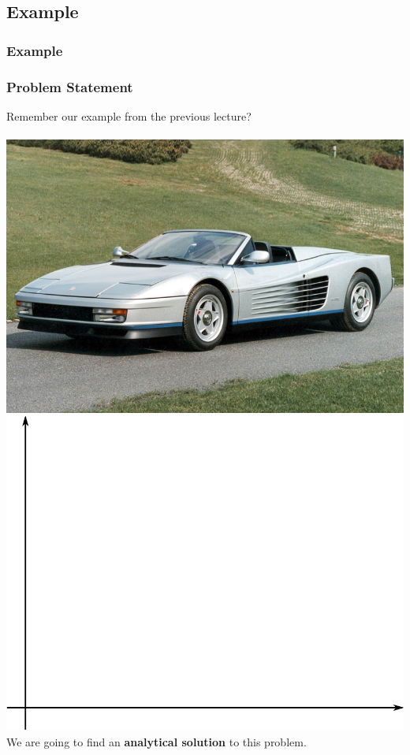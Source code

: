 \documentclass[fleqn]{beamer} %
\newcommand{\sectionIIsubsectionIIItitle}{Example}
\begin{document}
		\subsection{\sectionIIsubsectionIIItitle}\label{sectionIIsubsectionIII}

			\begin{frame}
				\frametitle{\sectionIIsubsectionIIItitle}
				\bigskip

				\frametitle{Problem Statement}

				Remember our example from the previous lecture?\vspace{5mm}\\

        		 \vspace{2mm}\\
	
				\includegraphics[scale=0.15]{images/ferrari.jpg} \hspace{10mm} \includegraphics[scale=0.10]{images/lecture1_fig2.png}\vspace{2mm}\\
	
				We are going to find an {\bf analytical solution} to this problem. 
  
				\btVFill 
			\end{frame}	
\end{document}
